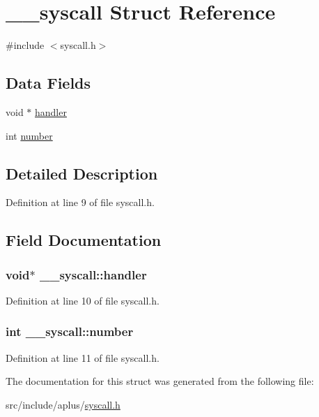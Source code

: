 \hypertarget{struct____syscall}{\section{\+\_\+\+\_\+syscall Struct Reference}
\label{struct____syscall}
}


{\ttfamily \#include $<$syscall.\+h$>$}

\subsection*{Data Fields}
\begin{DoxyCompactItemize}
\item 
void $\ast$ \hyperlink{struct____syscall_af1d75ee98d8568f74e8421654a1081d3}{handler}
\item 
int \hyperlink{struct____syscall_a7f020a41ed9bf3daff3dfc46ee673eef}{number}
\end{DoxyCompactItemize}


\subsection{Detailed Description}


Definition at line 9 of file syscall.\+h.



\subsection{Field Documentation}
\hypertarget{struct____syscall_af1d75ee98d8568f74e8421654a1081d3}{
\subsubsection[{handler}]{\setlength{\rightskip}{0pt plus 5cm}void$\ast$ \+\_\+\+\_\+syscall\+::handler}}\label{struct____syscall_af1d75ee98d8568f74e8421654a1081d3}


Definition at line 10 of file syscall.\+h.

\hypertarget{struct____syscall_a7f020a41ed9bf3daff3dfc46ee673eef}{
\subsubsection[{number}]{\setlength{\rightskip}{0pt plus 5cm}int \+\_\+\+\_\+syscall\+::number}}\label{struct____syscall_a7f020a41ed9bf3daff3dfc46ee673eef}


Definition at line 11 of file syscall.\+h.



The documentation for this struct was generated from the following file\+:\begin{DoxyCompactItemize}
\item 
src/include/aplus/\hyperlink{syscall_8h}{syscall.\+h}\end{DoxyCompactItemize}
